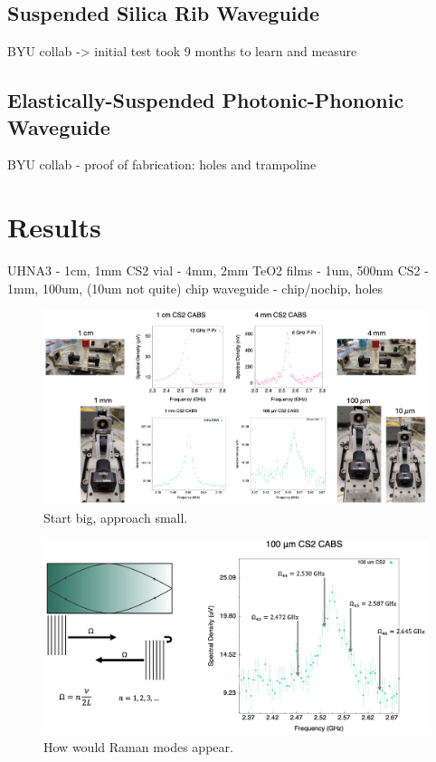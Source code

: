 \subsection{Suspended Silica Rib Waveguide}
\label{subsec:Raman:Target:Waveguide}

BYU collab -> initial test took 9 months to learn and measure

\subsection{Elastically-Suspended Photonic-Phononic Waveguide}
\label{subsec:Raman:Target:WigglyWaveguide}

BYU collab - proof of fabrication: holes and trampoline


\section{Results}
\label{sec:Raman:Results}

UHNA3 - 1cm, 1mm
CS2 vial - 4mm, 2mm
TeO2 films - 1um, 500nm
CS2 - 1mm, 100um, (10um not quite)
chip waveguide - chip/nochip, holes

\begin{figure}[t]
  \centering
  \includegraphics[width=\textwidth]{figs/4-Raman/StartBigApproachSmall.png}
  \caption{Start big, approach small.}
  \label{fig:StartBigApproachSmall}
\end{figure}

\begin{figure}[t]
  \centering
  \includegraphics[width=\textwidth]{figs/4-Raman/HowWouldRamanModesAppear.png}
  \caption{How would Raman modes appear.}
  \label{fig:HowWouldRamanModesAppear}
\end{figure}

